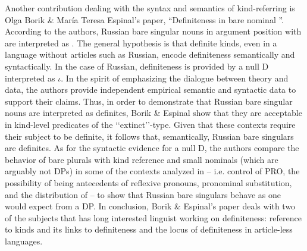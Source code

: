 \documentclass[output=paper]{langsci/langscibook}
\begin{document}
Another contribution dealing with the syntax and semantics of kind-referring  is Olga Borik \& María Teresa Espinal’s paper, “Definiteness in  bare nominal ”. According to the authors, Russian bare singular nouns in argument position with  are interpreted as . The general hypothesis is that definite kinds, even in a language without articles such as Russian, encode definiteness semantically and syntactically. In the case of Russian, definiteness is provided by a null D interpreted as $\iota$. In the spirit of emphasizing the dialogue between theory and data, the authors provide independent empirical semantic and syntactic data to support their claims. Thus, in order to demonstrate that Russian bare singular nouns are interpreted as definites, Borik \& Espinal show that they are acceptable in kind-level predicates of the ‘‘extinct’’-type. Given that these contexts require their subject to be definite, it follows that, semantically, Russian bare singulars are definites. As for the syntactic evidence for a null D, the authors compare the behavior of bare plurals with kind reference and small nominals (which are arguably not DPs) in some of the contexts analyzed in \citet{Pereltsvaig2006} -- i.e. control of PRO, the possibility of being antecedents of reflexive pronouns, pronominal substitution, and the distribution of  -- to show that Russian bare singulars behave as one would expect from a DP. In conclusion, Borik \& Espinal’s paper deals with two of the subjects that has long interested linguist working on definiteness: reference to kinds and its links to definiteness and the locus of definiteness in article-less languages. 
\end{document}
